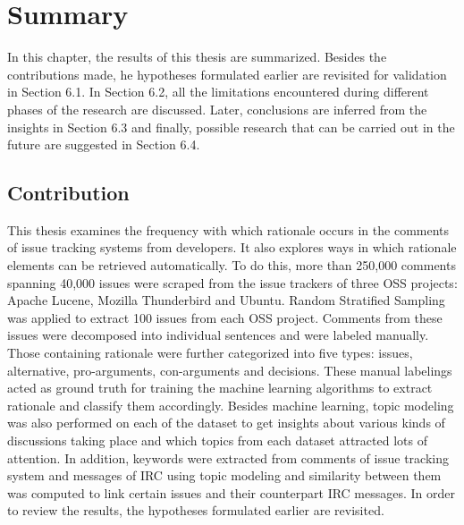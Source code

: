 \documentclass[a4paper,12pt,twoside]{report}
\begin{document}

\chapter{Summary}
In this chapter, the results of this thesis are summarized. Besides the contributions made, he hypotheses formulated earlier are revisited for validation in Section 6.1. In Section 6.2, all the limitations encountered during different phases of the research are discussed. Later, conclusions are inferred from the insights in Section 6.3 and finally, possible research that can be carried out in the future are suggested in Section 6.4.

\section{Contribution}
This thesis examines the frequency with which rationale occurs in the comments of issue tracking systems from developers. It also explores ways in which rationale elements can be retrieved automatically. To do this, more than 250,000 comments spanning 40,000 issues were scraped from the issue trackers of three \acs{OSS} projects: Apache Lucene, Mozilla Thunderbird and Ubuntu. Random Stratified Sampling was applied to extract 100 issues from each OSS project. Comments from these issues were decomposed into individual sentences and were labeled manually. Those containing rationale were further categorized into five types: issues, alternative, pro-arguments, con-arguments and decisions. These manual labelings acted as ground truth for training the machine learning algorithms to extract rationale and classify them accordingly. 
\newline \newline
Besides machine learning, topic modeling was also performed on each of the dataset to get insights about various kinds of discussions taking place and which topics from each dataset attracted lots of attention. In addition, keywords were extracted from comments of issue tracking system and messages of \acs{IRC} using topic modeling and similarity between them was computed to link certain issues and their counterpart \acs{IRC} messages. In order to review the results, the hypotheses formulated earlier are revisited.
\end{document}
